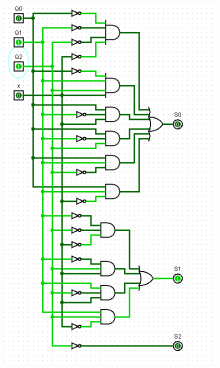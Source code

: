 \documentclass[]{article}
\begin{document}
\begin{minipage}{0.5\textwidth}
\begin{figure}[H]
	\centering
	\includegraphics[width=1\textwidth]{test0_3.png}
\end{figure}
\end{minipage}
\end{document}
